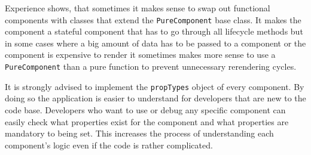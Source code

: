 Experience shows, that sometimes it makes sense to swap out functional components with classes that extend the \texttt{PureComponent} base class. It makes the component a stateful component that has to go through all lifecycle methods but in some cases where a big amount of data has to be passed to a component or the component is expensive to render it sometimes makes more sense to use a \texttt{PureComponent} than a pure function to prevent unnecessary rerendering cycles.

It is strongly advised to implement the \texttt{propTypes} object of every component. By doing so the application is easier to understand for developers that are new to the code base. Developers who want to use or debug any specific component can easily check what properties exist for the component and what properties are mandatory to being set. This increases the process of understanding each component's logic even if the code is rather complicated.









